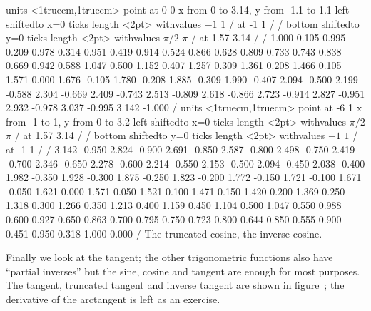 \figure
\texonly
\vbox{\beginpicture
\normalgraphs
\sevenpoint
\setcoordinatesystem units <1truecm,1truecm> point at 0 0
\setplotarea x from 0 to 3.14, y from -1.1 to 1.1
\axis left shiftedto x=0 ticks length <2pt> withvalues {$-1$} {$1$} / at -1 1 / /
\axis bottom shiftedto y=0 ticks length <2pt> withvalues 
  {$\pi/2$} {$\pi$} /
  at 1.57 3.14 / /
\setquadratic
{} 1.000 0.105 0.995 0.209 0.978 0.314 0.951 0.419 0.914 
0.524 0.866 0.628 0.809 0.733 0.743 0.838 0.669 0.942 0.588 
1.047 0.500 1.152 0.407 1.257 0.309 1.361 0.208 1.466 0.105 
1.571 0.000 1.676 -0.105 1.780 -0.208 1.885 -0.309 1.990 -0.407 
2.094 -0.500 2.199 -0.588 2.304 -0.669 2.409 -0.743 2.513 -0.809 
2.618 -0.866 2.723 -0.914 2.827 -0.951 2.932 -0.978 3.037 -0.995 
3.142 -1.000  /
\setcoordinatesystem units <1truecm,1truecm> point at -6 1
\setplotarea x from -1 to 1, y from 0 to 3.2
\axis left shiftedto x=0 ticks length <2pt> withvalues {$\pi/2$} {$\pi$} / 
  at 1.57 3.14 / /
\axis bottom shiftedto y=0 ticks length <2pt> withvalues 
  {$-1$} {$1$} /
  at -1 1 / /
\setquadratic
{} 3.142 -0.950 2.824 -0.900 2.691 -0.850 2.587 -0.800 2.498 
-0.750 2.419 -0.700 2.346 -0.650 2.278 -0.600 2.214 -0.550 2.153 
-0.500 2.094 -0.450 2.038 -0.400 1.982 -0.350 1.928 -0.300 1.875 
-0.250 1.823 -0.200 1.772 -0.150 1.721 -0.100 1.671 -0.050 1.621 
0.000 1.571 0.050 1.521 0.100 1.471 0.150 1.420 0.200 1.369 
0.250 1.318 0.300 1.266 0.350 1.213 0.400 1.159 0.450 1.104 
0.500 1.047 0.550 0.988 0.600 0.927 0.650 0.863 0.700 0.795 
0.750 0.723 0.800 0.644 0.850 0.555 0.900 0.451 0.950 0.318 
1.000 0.000  /
\endpicture}
\endtexonly
{}
\begincaption
The truncated cosine, the inverse cosine.
\endcaption
\endfigure

Finally we look at the tangent; the other trigonometric functions also
have ``partial inverses'' but the sine, cosine and tangent are enough
for most purposes. The tangent, truncated tangent and inverse tangent
are shown in figure~; the derivative of
the arctangent is left as an exercise.

